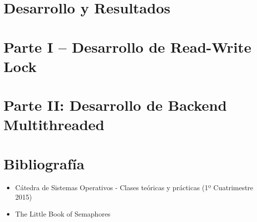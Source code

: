 \documentclass[a4paper,10pt,twoside]{article}
\begin{document}
\newpage




\tableofcontents

\newpage



\newpage
\section{Desarrollo y Resultados}

\section{Parte I – Desarrollo de Read-Write Lock}


\newpage

\section{Parte II: Desarrollo de Backend Multithreaded}


\newpage


\newpage
\section{Bibliografía}

\begin{itemize}
 \item Cátedra de Sistemas Operativos - Clases teóricas y prácticas (1º Cuatrimestre 2015)
 \item The Little Book of Semaphores
\end{itemize}
\end{document}
